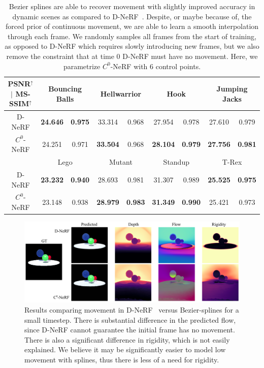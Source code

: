 \begin{table}[t]
    \centering
    \begin{tabular}{|c| c|c | c|c | c|c | c|c |}
    \hline
    \textbf{PSNR$^\uparrow$ $|$ MS-SSIM$^\uparrow$} & \multicolumn{2}{c|}{Bouncing Balls} & \multicolumn{2}{c|}{Hellwarrior} & \multicolumn{2}{c|}{Hook} & \multicolumn{2}{c|}{Jumping Jacks} \\
    \hline
    D-NeRF & \textbf{24.646} & \textbf{0.975}
           & 33.314 & 0.968
           & 27.954 & 0.978
           & 27.610 & 0.979 \\
    \hline
    $C^0$-NeRF & 24.251 & 0.971
               & \textbf{33.504} & 0.968
               & \textbf{28.104} & \textbf{0.979}
               & \textbf{27.756} & \textbf{0.981} \\
    \hline
    & \multicolumn{2}{c|}{Lego} & \multicolumn{2}{c|}{Mutant} & \multicolumn{2}{c|}{Standup} & \multicolumn{2}{c|}{T-Rex} \\
    \hline
    D-NeRF & \textbf{23.232} & \textbf{0.940}
           & 28.693 & 0.981
           & 31.307 & 0.989
           & \textbf{25.525} & \textbf{0.975} \\
    \hline
    $C^0$-NeRF & 23.148 & 0.938
               & \textbf{28.979} & \textbf{0.983}
               & \textbf{31.349} & \textbf{0.990}
               & 25.421 & 0.973 \\
    \hline
    \end{tabular}
    \caption{
        Bezier splines are able to recover movement with slightly improved accuracy in dynamic scenes as compared to D-NeRF~\cite{pumarola2020dnerf}. Despite, or maybe because of, the forced prior of continuous movement, we are able to learn a smooth interpolation through each frame. We randomly samples all frames from the start of training, as opposed to D-NeRF which requires slowly introducing new frames, but we also remove the constraint that at time 0 D-NeRF must have no movement. Here, we parametrize $C^0$-NeRF with 6 control points.
    }
\end{table}

\begin{figure}
    \includegraphics[width=\textwidth]{dnerf_compare}
    \caption{
        \label{fig:dnerf_cmp}
        Results comparing movement in D-NeRF~\cite{pumarola2020dnerf} versus Bezier-splines for a small timestep. There is substantial difference in the predicted flow, since D-NeRF cannot guarantee the initial frame has no movement. There is also a significant difference in rigidity, which is not easily explained. We believe it may be significantly easier to model low movement with splines, thus there is less of a need for rigidity.
    }
\end{figure}
